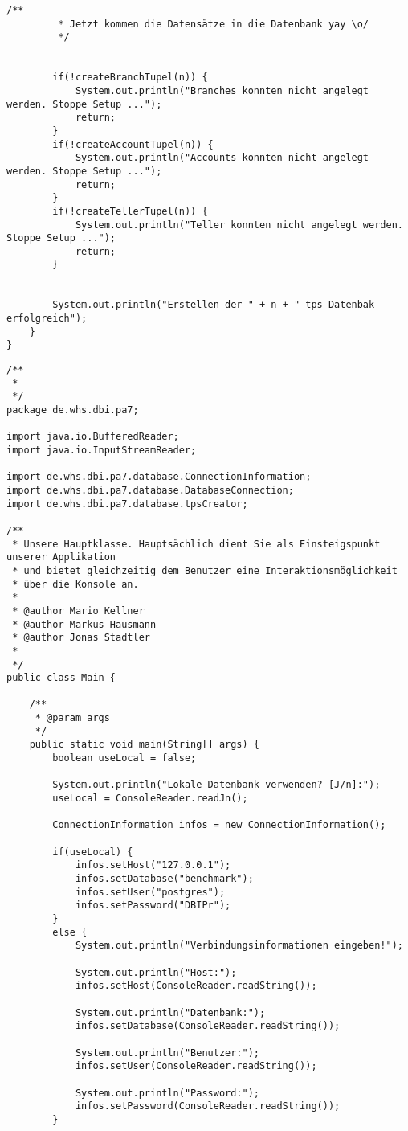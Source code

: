 \begin{lstlisting}[caption={tpsCreator}, label={lst:tpsv1}]
		/**
		 * Jetzt kommen die Datensätze in die Datenbank yay \o/
		 */
		
		
		if(!createBranchTupel(n)) {
			System.out.println("Branches konnten nicht angelegt werden. Stoppe Setup ...");
			return;
		}
		if(!createAccountTupel(n)) {
			System.out.println("Accounts konnten nicht angelegt werden. Stoppe Setup ...");
			return;
		}
		if(!createTellerTupel(n)) {
			System.out.println("Teller konnten nicht angelegt werden. Stoppe Setup ...");
			return;
		}
		

		System.out.println("Erstellen der " + n + "-tps-Datenbak erfolgreich");
	}	
}
\end{lstlisting}

\begin{lstlisting}[caption={Main}, label={lst:mainv1}]
/**
 * 
 */
package de.whs.dbi.pa7;

import java.io.BufferedReader;
import java.io.InputStreamReader;

import de.whs.dbi.pa7.database.ConnectionInformation;
import de.whs.dbi.pa7.database.DatabaseConnection;
import de.whs.dbi.pa7.database.tpsCreator;

/**
 * Unsere Hauptklasse. Hauptsächlich dient Sie als Einsteigspunkt unserer Applikation
 * und bietet gleichzeitig dem Benutzer eine Interaktionsmöglichkeit
 * über die Konsole an.
 * 
 * @author Mario Kellner
 * @author Markus Hausmann
 * @author Jonas Stadtler
 *
 */
public class Main {

	/**
	 * @param args
	 */
	public static void main(String[] args) {
		boolean useLocal = false;
		
		System.out.println("Lokale Datenbank verwenden? [J/n]:");
		useLocal = ConsoleReader.readJn();
		
		ConnectionInformation infos = new ConnectionInformation();
		
		if(useLocal) {
			infos.setHost("127.0.0.1");
			infos.setDatabase("benchmark");
			infos.setUser("postgres");
			infos.setPassword("DBIPr");
		}
		else {
			System.out.println("Verbindungsinformationen eingeben!");
			
			System.out.println("Host:");
			infos.setHost(ConsoleReader.readString());

			System.out.println("Datenbank:");
			infos.setDatabase(ConsoleReader.readString());
			
			System.out.println("Benutzer:");
			infos.setUser(ConsoleReader.readString());
			
			System.out.println("Password:");
			infos.setPassword(ConsoleReader.readString());
		}
		

\end{lstlisting}
